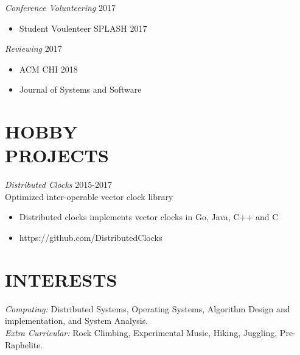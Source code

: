 \documentclass[line,margin]{res}
\begin{document}
\begin{resume}
{\sl Conference Volunteering} \hfill 2017
    \begin{itemize}
        \item Student Voulenteer SPLASH 2017
    \end{itemize}

{\sl Reviewing} \hfill 2017
    \begin{itemize}
        \item ACM CHI 2018
        \item Journal of Systems and Software
    \end{itemize}

\section{HOBBY \\ PROJECTS}
{\sl Distributed Clocks} \hfill 2015-2017\\
    Optimized inter-operable vector clock library
\begin{itemize} \itemsep -2pt
		\item Distributed clocks implements vector clocks in Go, Java, C++ and C
		\item https://github.com/DistributedClocks
\end{itemize}

\section{INTERESTS}
	{\sl Computing:}  Distributed Systems, Operating Systems, Algorithm Design and implementation, and System Analysis.\\
	{\sl Extra Curricular:} Rock Climbing, Experimental Music, Hiking, Juggling, Pre-Raphelite.\\

\end{resume}
\end{document}
